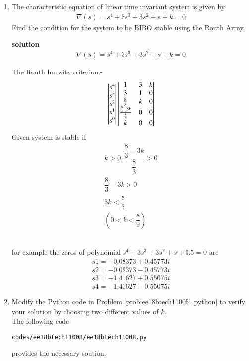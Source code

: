 \begin{enumerate}[label=\thesubsection.\arabic*.,ref=\thesubsection.\theenumi]
\item 
The characteristic equation of linear time invariant system is given by
\begin{align} 
\nabla(s)=s^4+3s^3+3s^2+s+k=0
\end{align}
Find the condition for the system to be BIBO stable using the Routh Array.

\textbf{solution}
\begin{align}
\nabla(s)=s^4+3s^3+3s^2+s+k=0
\end{align}

The Routh hurwitz criterion:-
\bigskip
\begin{align}
\begin{vmatrix}s^4\\s^3\\s^2\\s^1 \\ s^0\end{vmatrix}
\begin{vmatrix}1 & 3 & k \\ 3 & 1 & 0\\  \frac{8}{3}& k & 0\\ \frac{\frac{8}{3}-3k}{\frac{8}{3}} & 0 & 0\\k & 0 & 0\end{vmatrix} 
\end{align}
Given system is stable if
\begin{align}
k>0 ,  \dfrac{\dfrac{8}{3}-3k}{\dfrac{8}{3}}>0    
\\
{\dfrac{8}{3}-3k} >0
\\
3k<\dfrac{8}{3}
\\
(0<k<\dfrac{8}{9})
\end{align}

\\for example the zeros of polynomial $s^4+3s^3+3s^2+s+0.5=0$ are 
\begin{align}
s1=-0.08373+0.45773i
\\
s2=-0.08373-0.45773i
\\
s3=-1.41627+0.55075i
\\
s4=-1.41627-0.55075i
\end{align}

\item Modify the Python code in Problem \ref{prob:ee18btech11005_python} to verify your solution by choosing two different values of $k$.
\\
\solution 
The following code 
%
\begin{lstlisting}
codes/ee18btech11008/ee18btech11008.py
\end{lstlisting}
%
provides the necessary soution.


\end{enumerate}

